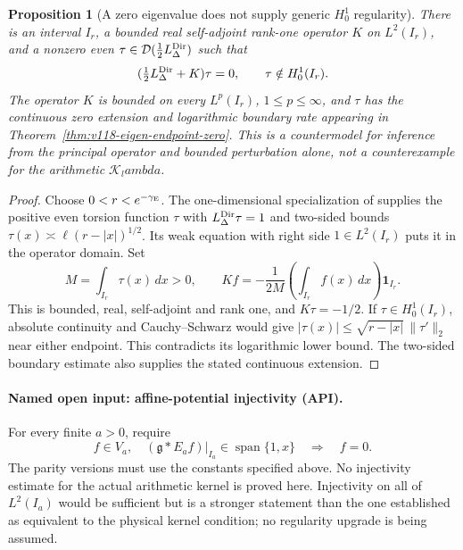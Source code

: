 \documentclass[11pt]{article}
\def\lambda{lambda}%
\newtheorem{proposition}[theorem]{Proposition}
\theoremstyle{remark}
\begin{document}
\begin{proposition}[A zero eigenvalue does not supply generic $H_0^1$ regularity]
\label{prop:ns51-no-generic-bootstrap}
There is an interval $I_r$, a bounded real self-adjoint rank-one
operator $K$ on $L^2(I_r)$, and a nonzero even
$\tau\in\mathcal D(\tfrac12L_\Delta^{\rm Dir})$ such that
\[
 (\tfrac12L_\Delta^{\rm Dir}+K)\tau=0,
 \qquad \tau\notin H_0^1(I_r).
\]
The operator $K$ is bounded on every $L^p(I_r)$, $1\le p\le\infty$,
and $\tau$ has the continuous zero extension and logarithmic boundary
rate appearing in Theorem~\ref{thm:v118-eigen-endpoint-zero}.
This is a countermodel for inference from the principal operator and
bounded perturbation alone, not a counterexample for the arithmetic
$\mathcal K_\lambda$.
\end{proposition}
\begin{proof}
Choose $0<r<e^{-\gamma_{\rm E}}$. The one-dimensional specialization
of \cite[Theorem 1.2]{HLSLogBoundary} supplies the positive even torsion
function $\tau$ with $L_\Delta^{\rm Dir}\tau=1$ and two-sided bounds
$\tau(x)\asymp\ell(r-|x|)^{1/2}$. Its weak equation with right side
$1\in L^2(I_r)$ puts it in the operator domain. Set
\[
 M=\int_{I_r}\tau(x)\,dx>0,\qquad
 Kf=-\frac{1}{2M}\left(\int_{I_r}f(x)\,dx\right)\mathbf1_{I_r}.
\]
This is bounded, real, self-adjoint and rank one, and $K\tau=-1/2$.
If $\tau\in H_0^1(I_r)$, absolute continuity and Cauchy--Schwarz
would give $|\tau(x)|\le\sqrt{r-|x|}\,\|\tau'\|_2$ near either
endpoint. This contradicts its logarithmic lower bound. The two-sided
boundary estimate also supplies the stated continuous extension.
\end{proof}

\paragraph{Named open input: affine-potential injectivity (API).}
For every finite $a>0$, require
\begin{equation}\label{eq:ns51-api}
 f\in V_a,\quad (\mathfrak g*E_af)|_{I_a}\in
 \operatorname{span}\{1,x\}\quad\Longrightarrow\quad f=0.
\end{equation}
The parity versions must use the constants specified above. No
injectivity estimate for the actual arithmetic kernel is proved here.
Injectivity on all of $L^2(I_a)$ would be sufficient but is a stronger
statement than the one established as equivalent to the physical
kernel condition; no regularity upgrade is being assumed.
\end{document}
